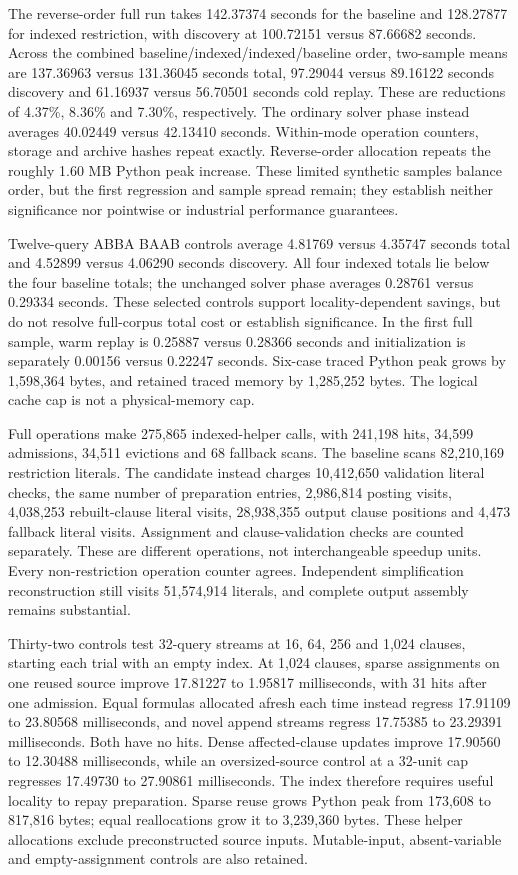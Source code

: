 \documentclass[11pt,a4paper]{article}
\numberwithin{equation}{section}
\theoremstyle{plain}
\theoremstyle{definition}
\theoremstyle{remark}
\begin{document}
The reverse-order full run takes 142.37374 seconds for the baseline and 128.27877 for indexed restriction, with discovery at 100.72151 versus 87.66682 seconds. Across the combined baseline/indexed/indexed/baseline order, two-sample means are 137.36963 versus 131.36045 seconds total, 97.29044 versus 89.16122 seconds discovery and 61.16937 versus 56.70501 seconds cold replay. These are reductions of 4.37\%, 8.36\% and 7.30\%, respectively. The ordinary solver phase instead averages 40.02449 versus 42.13410 seconds. Within-mode operation counters, storage and archive hashes repeat exactly. Reverse-order allocation repeats the roughly 1.60 MB Python peak increase. These limited synthetic samples balance order, but the first regression and sample spread remain; they establish neither significance nor pointwise or industrial performance guarantees.

Twelve-query ABBA BAAB controls average 4.81769 versus 4.35747 seconds total and 4.52899 versus 4.06290 seconds discovery. All four indexed totals lie below the four baseline totals; the unchanged solver phase averages 0.28761 versus 0.29334 seconds. These selected controls support locality-dependent savings, but do not resolve full-corpus total cost or establish significance. In the first full sample, warm replay is 0.25887 versus 0.28366 seconds and initialization is separately 0.00156 versus 0.22247 seconds. Six-case traced Python peak grows by 1,598,364 bytes, and retained traced memory by 1,285,252 bytes. The logical cache cap is not a physical-memory cap.

Full operations make 275,865 indexed-helper calls, with 241,198 hits, 34,599 admissions, 34,511 evictions and 68 fallback scans. The baseline scans 82,210,169 restriction literals. The candidate instead charges 10,412,650 validation literal checks, the same number of preparation entries, 2,986,814 posting visits, 4,038,253 rebuilt-clause literal visits, 28,938,355 output clause positions and 4,473 fallback literal visits. Assignment and clause-validation checks are counted separately. These are different operations, not interchangeable speedup units. Every non-restriction operation counter agrees. Independent simplification reconstruction still visits 51,574,914 literals, and complete output assembly remains substantial.

Thirty-two controls test 32-query streams at 16, 64, 256 and 1,024 clauses, starting each trial with an empty index. At 1,024 clauses, sparse assignments on one reused source improve 17.81227 to 1.95817 milliseconds, with 31 hits after one admission. Equal formulas allocated afresh each time instead regress 17.91109 to 23.80568 milliseconds, and novel append streams regress 17.75385 to 23.29391 milliseconds. Both have no hits. Dense affected-clause updates improve 17.90560 to 12.30488 milliseconds, while an oversized-source control at a 32-unit cap regresses 17.49730 to 27.90861 milliseconds. The index therefore requires useful locality to repay preparation. Sparse reuse grows Python peak from 173,608 to 817,816 bytes; equal reallocations grow it to 3,239,360 bytes. These helper allocations exclude preconstructed source inputs. Mutable-input, absent-variable and empty-assignment controls are also retained.
\end{document}
